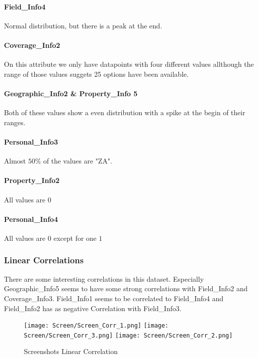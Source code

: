 \paragraph{Field\_Info4} Normal distribution, but there is a peak at the end.

\paragraph{Coverage\_Info2} On this attribute we only have datapoints with four different values allthough the range of those values suggets 25 options have been available.

\paragraph{Geographic\_Info2 \& Property\_Info 5} Both of these values show a  even distribution with a spike at the begin of their ranges.

\paragraph{Personal\_Info3} Almost $50 \text{\%}$ of the values are "ZA".
\paragraph{Property\_Info2} All values are $0$
\paragraph{Personal\_Info4} All values are $0$ except for one $1$

\subsubsection{Linear Correlations}

There are some interesting correlations in this dataset. Especially Geographic\_Info5 seems to have some strong correlations with Field\_Info2 and Coverage\_Info3. Field\_Info1 seems to be correlated to Field\_Info4 and Field\_Info2 has as negative Correlation with Field\_Info3.

\begin{figure}[H]
	\begin{center}
		\texttt{[image: Screen/Screen\_Corr\_1.png]}
		\texttt{[image: Screen/Screen\_Corr\_3.png]}
		\texttt{[image: Screen/Screen\_Corr\_2.png]}

	\end{center}
	\caption{Screenshots Linear Correlation}
\end{figure}

